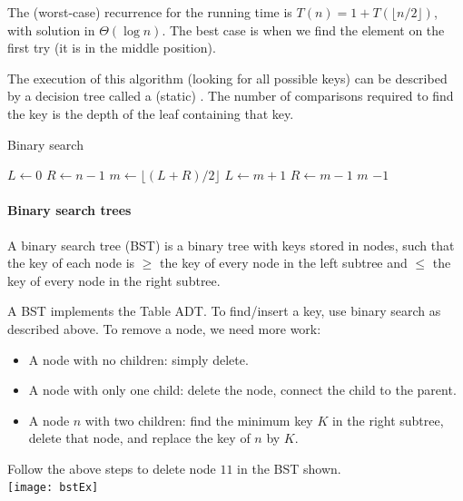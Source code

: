 The (worst-case) recurrence for the running time is $T(n) = 1 +  T(\lfloor n/2 \rfloor)$, with 
solution in $\Theta(\log n)$. The best case is when we find the element on the first try (it is in the middle position).

The execution of this algorithm (looking for all possible keys) can be 
described by a decision tree called a (static) . The 
number of comparisons required to find the key is the depth of the leaf 
containing that key.


\begin{algorithm}[H]
  \caption{Binary search
    \label{alg:binsearch}}
\begin{algorithmic}[1]
	\State $L \gets 0$
	\State $R \gets n-1$
		\State $m \gets \lfloor (L+R)/2\rfloor$ 
			\State $L\gets m+1$
			\State $R\gets m-1$
		\Else 
			\State \Return $m$ 
		\EndIf
	\EndWhile
	\Return $-1$ 
\EndFunction
\end{algorithmic}
\end{algorithm}

\paragraph{Binary search trees}
\begin{Definition}
A {binary search tree} (BST) is a binary tree with keys stored in nodes, 
such that the key of each node is $\geq$ the key of every node in the left subtree and $\leq$ 
the key of  every node in the right subtree.
\end{Definition}


A BST implements the Table ADT. To find/insert a key, use binary search as 
described above. To remove a node, we need more work:
\begin{itemize}
\item A node with no children: simply delete.
\item A node with only one child: delete the node, connect the child 
to the parent.
\item A node $n$ with two children: find the minimum key $K$ in the 
right subtree, delete that node, and replace the key of $n$ by $K$.
\end{itemize}

\begin{Boxample}[1] \label{eg:bstDeleteRight}
Follow the above steps to delete node $11$ in the BST shown.\\
\newline
\texttt{[image: bstEx]}
\end{Boxample}


